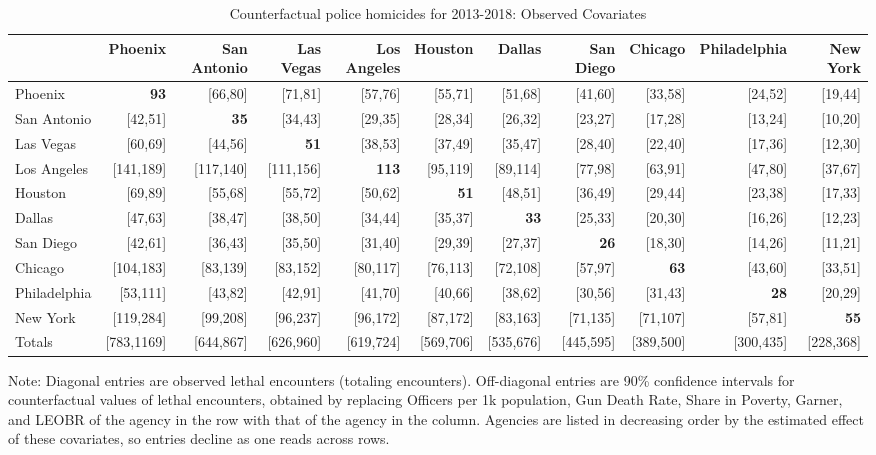 \begin{table}[h!]\centering\scriptsize\tabcolsep=0.1cm\caption{Counterfactual police homicides for 2013-2018: Observed Covariates} \label{table:bootstrap_counterfactual_obs}\begin{tabular}{lrrrrrrrrrr}\hline \hline&Phoenix&San Antonio&Las Vegas&Los Angeles&Houston&Dallas&San Diego&Chicago&Philadelphia&New York\\
\hline
Phoenix&\textbf{93}&[66,80]&[71,81]&[57,76]&[55,71]&[51,68]&[41,60]&[33,58]&[24,52]&[19,44]\\
San Antonio&[42,51]&\textbf{35}&[34,43]&[29,35]&[28,34]&[26,32]&[23,27]&[17,28]&[13,24]&[10,20]\\
Las Vegas&[60,69]&[44,56]&\textbf{51}&[38,53]&[37,49]&[35,47]&[28,40]&[22,40]&[17,36]&[12,30]\\
Los Angeles&[141,189]&[117,140]&[111,156]&\textbf{113}&[95,119]&[89,114]&[77,98]&[63,91]&[47,80]&[37,67]\\
Houston&[69,89]&[55,68]&[55,72]&[50,62]&\textbf{51}&[48,51]&[36,49]&[29,44]&[23,38]&[17,33]\\
Dallas&[47,63]&[38,47]&[38,50]&[34,44]&[35,37]&\textbf{33}&[25,33]&[20,30]&[16,26]&[12,23]\\
San Diego&[42,61]&[36,43]&[35,50]&[31,40]&[29,39]&[27,37]&\textbf{26}&[18,30]&[14,26]&[11,21]\\
Chicago&[104,183]&[83,139]&[83,152]&[80,117]&[76,113]&[72,108]&[57,97]&\textbf{63}&[43,60]&[33,51]\\
Philadelphia&[53,111]&[43,82]&[42,91]&[41,70]&[40,66]&[38,62]&[30,56]&[31,43]&\textbf{28}&[20,29]\\
New York&[119,284]&[99,208]&[96,237]&[96,172]&[87,172]&[83,163]&[71,135]&[71,107]&[57,81]&\textbf{55}\\
\hline
Totals&[783,1169]&[644,867]&[626,960]&[619,724]&[569,706]&[535,676]&[445,595]&[389,500]&[300,435]&[228,368]\\
\hline 
 \end{tabular} 
 \begin{center} 
 \begin{minipage}{1.05\textwidth} %
 {\footnotesize Note: Diagonal entries are observed lethal encounters (totaling \totalincidentsten{} encounters). Off-diagonal entries are 90\% confidence intervals for counterfactual values of lethal encounters, obtained by replacing Officers per 1k population, Gun Death Rate, Share in Poverty, Garner, and LEOBR of the agency in the row with that of the agency in the column. Agencies are listed in decreasing order by the estimated effect of these covariates, so entries decline as one reads across rows.} 
 \end{minipage} 
 \end{center} 
 \end{table}